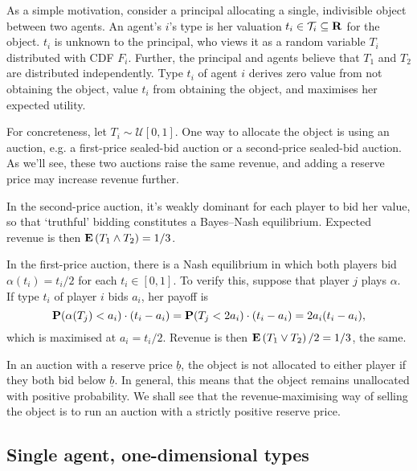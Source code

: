 \documentclass[11pt,letterpaper,reqno,oneside]{article}
\begin{document}
As a simple motivation, consider a principal allocating a single, indivisible object between two agents. An agent's $i$'s type is her valuation $t_i \in \mathcal{T}_i \subseteq \mathbf{R}$ for the object. $t_i$ is unknown to the principal, who views it as a random variable $T_i$ distributed with CDF $F_i$. Further, the principal and agents believe that $T_1$ and $T_2$ are distributed independently. Type $t_i$ of agent $i$ derives zero value from not obtaining the object, value $t_i$ from obtaining the object, and maximises her expected utility.

For concreteness, let $T_i \sim \mathcal{U}[0,1]$. One way to allocate the object is using an auction, e.g. a first-price sealed-bid auction or a second-price sealed-bid auction. As we'll see, these two auctions raise the same revenue, and adding a reserve price may increase revenue further.

In the second-price auction, it's weakly dominant for each player to bid her value, so that `truthful' bidding constitutes a Bayes--Nash equilibrium. Expected revenue is then $\mathbf{E}\left( T_1 \wedge T_2 \right) = 1/3$.

In the first-price auction, there is a Nash equilibrium in which both players bid $\alpha(t_i) = t_i/2$ for each $t_i \in [0,1]$. To verify this, suppose that player $j$ plays $\alpha$. If type $t_i$ of player $i$ bids $a_i$, her payoff is
%
\begin{equation*}
	\mathbf{P}( \alpha(T_j) < a_i ) \cdot (t_i-a_i)
	= \mathbf{P}( T_j < 2 a_i ) \cdot (t_i-a_i) = 2 a_i (t_i-a_i) ,
\end{equation*}
%
which is maximised at $a_i=t_i/2$. Revenue is then $\mathbf{E}\left( T_1 \vee T_2 \right) / 2 = 1/3$, the same.

In an auction with a reserve price $\underline{b}$, the object is not allocated to either player if they both bid below $\underline{b}$. In general, this means that the object remains unallocated with positive probability. We shall see that the revenue-maximising way of selling the object is to run an auction with a strictly positive reserve price.



\pagebreak
\subsection{Single agent, one-dimensional types}
\label{sec:mech_desi:single_agent_one_dimension}
\end{document}
